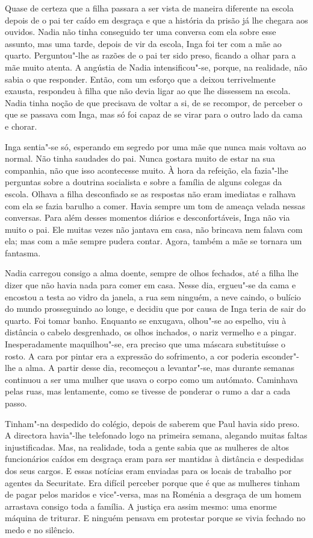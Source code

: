 Quase de certeza que a filha passara a ser vista de maneira diferente na
escola depois de o pai ter caído em desgraça e que a história da prisão
já lhe chegara aos ouvidos. Nadia não tinha conseguido ter uma conversa
com ela sobre esse assunto, mas uma tarde, depois de vir da escola, Inga
foi ter com a mãe ao quarto. Perguntou"-lhe as razões de o pai ter sido
preso, ficando a olhar para a mãe muito atenta. A angústia de Nadia
intensificou"-se, porque, na realidade, não sabia o que responder. Então,
com um esforço que a deixou terrivelmente exausta, respondeu à filha
que não devia ligar ao que lhe dissessem na escola. Nadia tinha noção de
que precisava de voltar a si, de se recompor, de perceber o que se
passava com Inga, mas só foi capaz de se virar para o outro lado da cama
e chorar.

Inga sentia"-se só, esperando em segredo por uma mãe
que nunca mais voltava ao normal. Não tinha saudades do pai. Nunca
gostara muito de estar na sua companhia, não que isso acontecesse muito.
À hora da refeição, ela fazia"-lhe perguntas sobre a doutrina socialista e sobre a família de alguns
colegas da escola. Olhava a filha desconfiado se as respostas não eram
imediatas e ralhava com ela se fazia barulho a comer. Havia sempre um
tom de ameaça velada nessas conversas. Para além desses momentos diários
e desconfortáveis, Inga não via muito o pai. Ele muitas vezes não
jantava em casa, não brincava nem falava com ela; mas com a mãe sempre
pudera contar. Agora, também a mãe se tornara um fantasma.

\bigskip

Nadia carregou consigo a alma doente, sempre de olhos fechados, até a
filha lhe dizer que não havia nada para comer em casa. Nesse dia,
ergueu"-se da cama e encostou a testa ao vidro da janela, a rua sem
ninguém, a neve caindo, o bulício do mundo prosseguindo ao longe, e
decidiu que por causa de Inga teria de sair do quarto. Foi tomar banho.
Enquanto se enxugava, olhou"-se ao espelho, viu à distância o cabelo
desgrenhado, os olhos inchados, o nariz vermelho e a pingar.
Inesperadamente maquilhou"-se, era preciso que uma máscara substituísse o rosto. A cara por pintar
era a expressão do sofrimento, a cor poderia esconder"-lhe a alma. A
partir desse dia, recomeçou a levantar"-se, mas durante semanas continuou
a ser uma mulher que usava o corpo como um autómato. Caminhava pelas
ruas, mas lentamente, como se tivesse de ponderar o rumo a dar a cada
passo.

Tinham"-na despedido do colégio, depois de saberem que Paul havia sido
preso. A directora havia"-lhe telefonado logo na primeira semana,
alegando muitas faltas injustificadas. Mas, na realidade, toda a gente
sabia que as mulheres de altos funcionários caídos em desgraça eram para ser mantidas à
distância e despedidas dos seus cargos. E essas notícias eram enviadas
para os locais de trabalho por agentes da Securitate. Era difícil
perceber porque que é que as mulheres tinham de pagar pelos maridos e
vice"-versa, mas na Roménia a desgraça de um homem arrastava consigo
toda a família. A justiça era assim mesmo: uma enorme máquina de
triturar. E ninguém pensava em protestar porque se vivia fechado no
medo e no silêncio.

